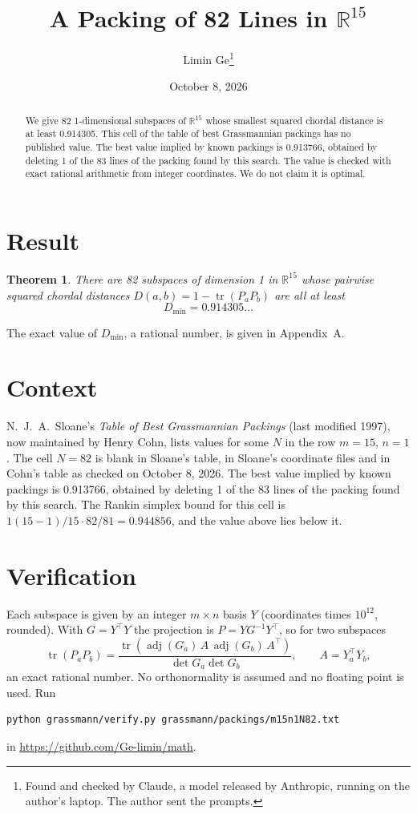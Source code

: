 \documentclass[11pt,a4paper]{article}
\title{A Packing of 82 Lines in $\mathbb{R}^{15}$}
\author{Limin Ge\thanks{Found and checked by Claude, a model released by Anthropic, running on the author's laptop. The author sent the prompts.}}
\date{October 8, 2026}
\newtheorem*{theorem}{Theorem}
\begin{document}
\maketitle
\begin{abstract}
We give 82 1-dimensional subspaces of $\mathbb{R}^{15}$ whose smallest squared chordal distance is at least 0.914305. This cell of the table of best Grassmannian packings has no published value. The best value implied by known packings is 0.913766, obtained by deleting 1 of the 83 lines of the packing found by this search. The value is checked with exact rational arithmetic from integer coordinates. We do not claim it is optimal.
\end{abstract}

\section{Result}
\begin{theorem}
There are 82 subspaces of dimension 1 in $\mathbb{R}^{15}$ whose pairwise squared chordal distances $D(a,b) = 1 - \operatorname{tr}(P_aP_b)$ are all at least
\[ D_{\min} = 0.914305\ldots \]
\end{theorem}
The exact value of $D_{\min}$, a rational number, is given in Appendix~A.


\section{Context}
N.~J.~A.~Sloane's \emph{Table of Best Grassmannian Packings} (last modified 1997), now maintained by Henry Cohn, lists values for some $N$ in the row $m=15$, $n=1$. The cell $N=82$ is blank in Sloane's table, in Sloane's coordinate files and in Cohn's table as checked on October 8, 2026. The best value implied by known packings is 0.913766, obtained by deleting 1 of the 83 lines of the packing found by this search. The Rankin simplex bound for this cell is $1(15-1)/15\cdot 82/81 = 0.944856$, and the value above lies below it.


\section{Verification}
Each subspace is given by an integer $m\times n$ basis $Y$ (coordinates times $10^{12}$, rounded). With $G=Y^\top Y$ the projection is $P=YG^{-1}Y^\top$, so for two subspaces
\[ \operatorname{tr}(P_aP_b)=\frac{\operatorname{tr}(\operatorname{adj}(G_a)\,A\,\operatorname{adj}(G_b)\,A^\top)}{\det G_a\det G_b},\qquad A=Y_a^\top Y_b, \]
an exact rational number. No orthonormality is assumed and no floating point is used. Run
\begin{verbatim}
python grassmann/verify.py grassmann/packings/m15n1N82.txt
\end{verbatim}
in \url{https://github.com/Ge-limin/math}.
\end{document}
